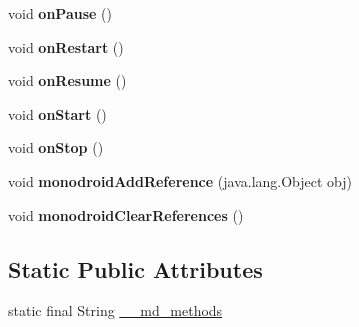 \begin{DoxyCompactItemize}
void {\bfseries on\+Pause} ()
\item 
\mbox{\label{classmd5b60ffeb829f638581ab2bb9b1a7f4f3f_1_1_forms_application_activity_aa1824a9a5587af10b534406d8b8bc137}} 
void {\bfseries on\+Restart} ()
\item 
\mbox{\label{classmd5b60ffeb829f638581ab2bb9b1a7f4f3f_1_1_forms_application_activity_abf7623ad3707e398b62e6a98b23091c8}} 
void {\bfseries on\+Resume} ()
\item 
\mbox{\label{classmd5b60ffeb829f638581ab2bb9b1a7f4f3f_1_1_forms_application_activity_a14cbfd53ce03eda40b28f39d28f24464}} 
void {\bfseries on\+Start} ()
\item 
\mbox{\label{classmd5b60ffeb829f638581ab2bb9b1a7f4f3f_1_1_forms_application_activity_a64374f0d736d5898daa13bf81ca1f3a0}} 
void {\bfseries on\+Stop} ()
\item 
\mbox{\label{classmd5b60ffeb829f638581ab2bb9b1a7f4f3f_1_1_forms_application_activity_a2c4010f783599213a274f63e6d5fd3d3}} 
void {\bfseries monodroid\+Add\+Reference} (java.\+lang.\+Object obj)
\item 
\mbox{\label{classmd5b60ffeb829f638581ab2bb9b1a7f4f3f_1_1_forms_application_activity_a837c4f559a7030eedd33be67a0272eaf}} 
void {\bfseries monodroid\+Clear\+References} ()
\end{DoxyCompactItemize}
\subsection*{Static Public Attributes}
\begin{DoxyCompactItemize}
\item 
static final String \hyperlink{classmd5b60ffeb829f638581ab2bb9b1a7f4f3f_1_1_forms_application_activity_a37d533299315e969b66527bb86dba664}{\+\_\+\+\_\+md\+\_\+methods}
\end{DoxyCompactItemize}



